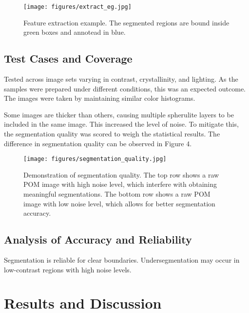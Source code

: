 \documentclass[12pt]{article}
\begin{document}
\begin{figure}[ht]
    \centering
    \texttt{[image: figures/extract\_eg.jpg]}
    \caption{\centering Feature extraction example. The segmented regions are bound inside green boxes and annotead in blue.}
\end{figure}

\subsection{Test Cases and Coverage}
Tested across image sets varying in contrast, crystallinity, and lighting. As the samples were prepared under different conditions, 
this was an expected outcome. The images were taken by maintaining similar color histograms. 

Some images are thicker than others, causing multiple spherulite layers to be included in the same image. This increased the level of 
noise. To mitigate this, the segmentation quality was scored to weigh the statistical results. The difference in segmentation quality 
can be observed in Figure 4.

\begin{figure}[ht]
    \centering
    \texttt{[image: figures/segmentation\_quality.jpg]}
    \caption{\centering Demonstration of segmentation quality. The top row shows a raw POM image with high noise level, which interfere with obtaining meaningful segmentations.
    The bottom row shows a raw POM image with low noise level, which allows for better segmentation accuracy.}
\end{figure}


\subsection{Analysis of Accuracy and Reliability}
Segmentation is reliable for clear boundaries. Undersegmentation may occur in low-contrast regions with high noise levels.

\section{Results and Discussion}
\end{document}

